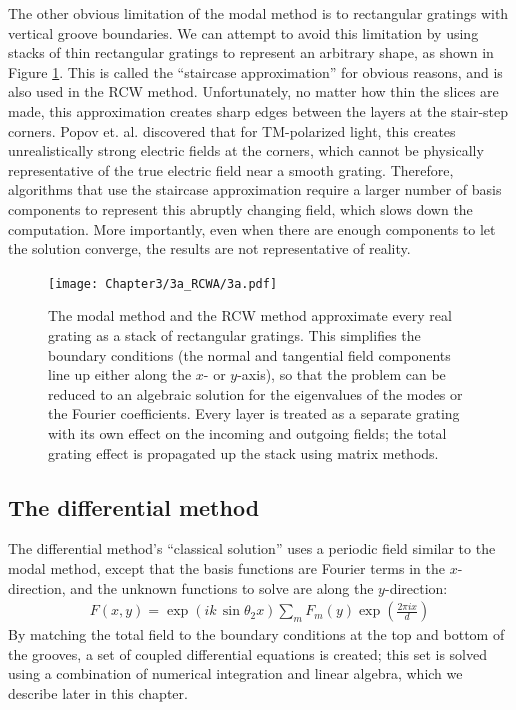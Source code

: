 \documentclass[singlespace,proposal]{uofsthesis-cs}
\begin{document}
The other obvious limitation of the modal method is to rectangular gratings with vertical groove boundaries.  We can attempt to avoid this limitation by using stacks of thin rectangular gratings to represent an arbitrary shape, as shown in Figure \ref{3a}.  This is called the ``staircase approximation'' for obvious reasons, and is also used in the RCW method.  Unfortunately, no matter how thin the slices are made, this approximation creates sharp edges between the layers at the stair-step corners.  Popov et. al. discovered that for TM-polarized light, this creates unrealistically strong electric fields at the corners, which cannot be physically representative of the true electric field near a smooth grating.  Therefore, algorithms that use the staircase approximation require a larger number of basis components to represent this abruptly changing field, which slows down the computation.  More importantly, even when there are enough components to let the solution converge, the results are not representative of reality. \cite{Pop02} 

\begin{figure}[tbp] %
   \centering
   \texttt{[image: Chapter3/3a\_RCWA/3a.pdf]} 
   \caption{The modal method and the RCW method approximate every real grating as a stack of rectangular gratings.  This simplifies the boundary conditions (the normal and tangential field components line up either along the $x$- or $y$-axis), so that the problem can be reduced to an algebraic solution for the eigenvalues of the modes or the Fourier coefficients.  Every layer is treated as a separate grating with its own effect on the incoming and outgoing fields; the total grating effect is propagated up the stack using matrix methods.}
   \label{3a}
\end{figure}

\subsection{The differential method}
The differential method's ``classical solution'' uses a periodic field similar to the modal method, except that the basis functions are Fourier terms in the $x$-direction, and the unknown functions to solve are along the $y$-direction:
\begin{eqnarray}
F(x,y)=\exp\left( ik\, \sin \theta_{2}x \right) \sum\limits_m F_m(y) \exp \left( \frac{2\pi i x}{d} \right)
\end{eqnarray}
By matching the total field to the boundary conditions at the top and bottom of the grooves, a set of coupled differential equations is created; this set is solved using a combination of numerical integration and linear algebra, which we describe later in this chapter.  
\end{document}
